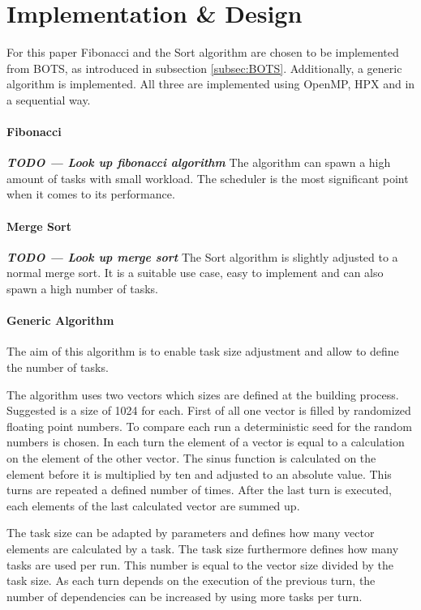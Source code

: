 \section{Implementation \& Design}
  For this paper Fibonacci and the Sort algorithm are chosen to be implemented from BOTS, as introduced in subsection \ref{subsec:BOTS}.
  Additionally, a generic algorithm is implemented.
  All three are implemented using OpenMP, HPX and in a sequential way.
  
  \paragraph{Fibonacci}
  \textit{\textbf{TODO --- Look up fibonacci algorithm}}
  The algorithm can spawn a high amount of tasks with small workload.
  The scheduler is the most significant point when it comes to its performance.
  
  \paragraph{Merge Sort}
  \textit{\textbf{TODO --- Look up merge sort}}
  The Sort algorithm is slightly adjusted to a normal merge sort.
  It is a suitable use case, easy to implement and can also spawn a high number of tasks.
  
  \paragraph{Generic Algorithm}
  The aim of this algorithm is to enable task size adjustment and allow to define the number of tasks.
  
  The algorithm uses two vectors which sizes are defined at the building process.
  Suggested is a size of 1024 for each.
  First of all one vector is filled by randomized floating point numbers.
  To compare each run a deterministic seed for the random numbers is chosen.
  In each turn the element of a vector is equal to a calculation on the element of the other vector.
  The sinus function is calculated on the element before it is multiplied by ten and adjusted to an absolute value.
  This turns are repeated a defined number of times.
  After the last turn is executed, each elements of the last calculated vector are summed up.
  
  The task size can be adapted by parameters and defines how many vector elements are calculated by a task.
  The task size furthermore defines how many tasks are used per run.
  This number is equal to the vector size divided by the task size.
  As each turn depends on the execution of the previous turn, the number of dependencies can be increased by using more tasks per turn.
		
